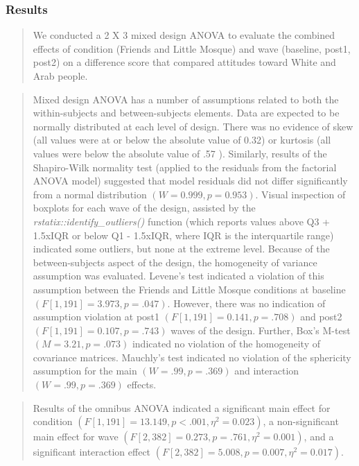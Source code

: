 \documentclass[
  11pt,
]{book}
\begin{document}
\hypertarget{results}{%
\subsubsection{Results}\label{results}}

\begin{quote}
We conducted a 2 X 3 mixed design ANOVA to evaluate the combined effects of condition (Friends and Little Mosque) and wave (baseline, post1, post2) on a difference score that compared attitudes toward White and Arab people.
\end{quote}

\begin{quote}
Mixed design ANOVA has a number of assumptions related to both the within-subjects and between-subjects elements. Data are expected to be normally distributed at each level of design. There was no evidence of skew (all values were at or below the absolute value of 0.32) or kurtosis (all values were below the absolute value of .57 \citep{kline_data_2016}). Similarly, results of the Shapiro-Wilk normality test (applied to the residuals from the factorial ANOVA model) suggested that model residuals did not differ significantly from a normal distribution \((W = 0.999, p = 0.953)\). Visual inspection of boxplots for each wave of the design, assisted by the \emph{rstatix::identify\_outliers()} function (which reports values above Q3 + 1.5xIQR or below Q1 - 1.5xIQR, where IQR is the interquartile range) indicated some outliers, but none at the extreme level. Because of the between-subjects aspect of the design, the homogeneity of variance assumption was evaluated. Levene's test indicated a violation of this assumption between the Friends and Little Mosque conditions at baseline \((F[1, 191] = 3.973, p = .047)\). However, there was no indication of assumption violation at post1 \((F[1, 191] = 0.141, p = .708)\) and post2 \((F[1, 191] = 0.107, p = .743)\) waves of the design. Further, Box's M-test \((M = 3.21, p = .073)\) indicated no violation of the homogeneity of covariance matrices. Mauchly's test indicated no violation of the sphericity assumption for the main \((W = .99, p = .369)\) and interaction \((W = .99, p = .369)\) effects.
\end{quote}

\begin{quote}
Results of the omnibus ANOVA indicated a significant main effect for condition \((F[1, 191] = 13.149, p < .001, \eta^{2} = 0.023)\), a non-significant main effect for wave \((F[2, 382] = 0.273, p = .761, \eta^{2} = 0.001)\), and a significant interaction effect \((F[2, 382] = 5.008, p = 0.007, \eta^{2} = 0.017)\).
\end{quote}
\end{document}
